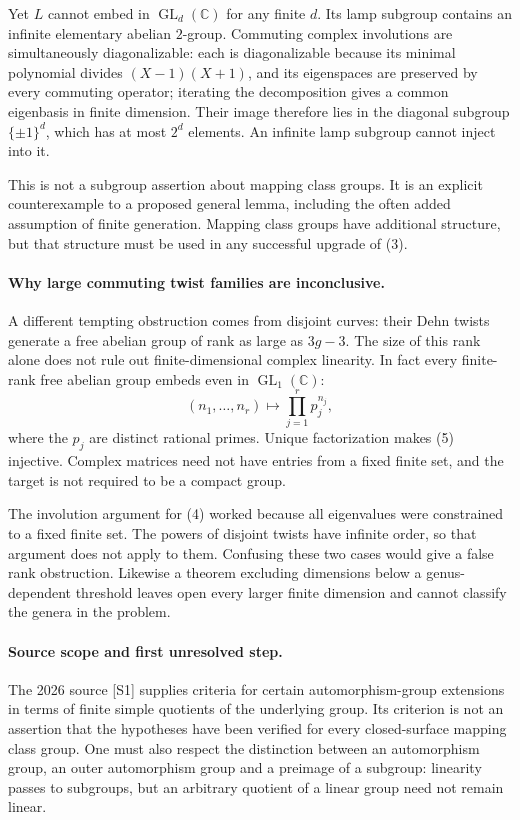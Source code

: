 \documentclass[11pt]{article}
\begin{document}
Yet $L$ cannot embed in $\operatorname{GL}_d(\mathbb C)$ for any finite $d$. Its lamp subgroup contains an infinite elementary abelian $2$-group. Commuting complex involutions are simultaneously diagonalizable: each is diagonalizable because its minimal polynomial divides $(X-1)(X+1)$, and its eigenspaces are preserved by every commuting operator; iterating the decomposition gives a common eigenbasis in finite dimension. Their image therefore lies in the diagonal subgroup $\{\pm1\}^d$, which has at most $2^d$ elements. An infinite lamp subgroup cannot inject into it.

This is not a subgroup assertion about mapping class groups. It is an explicit counterexample to a proposed general lemma, including the often added assumption of finite generation. Mapping class groups have additional structure, but that structure must be used in any successful upgrade of (3).

\paragraph{Why large commuting twist families are inconclusive.}
A different tempting obstruction comes from disjoint curves: their Dehn twists generate a free abelian group of rank as large as $3g-3$. The size of this rank alone does not rule out finite-dimensional complex linearity. In fact every finite-rank free abelian group embeds even in $\operatorname{GL}_1(\mathbb C)$:
\[
 (n_1,\ldots,n_r)\longmapsto\prod_{j=1}^r p_j^{n_j},        \tag{5}
\]
where the $p_j$ are distinct rational primes. Unique factorization makes (5) injective. Complex matrices need not have entries from a fixed finite set, and the target is not required to be a compact group.

The involution argument for (4) worked because all eigenvalues were constrained to a fixed finite set. The powers of disjoint twists have infinite order, so that argument does not apply to them. Confusing these two cases would give a false rank obstruction. Likewise a theorem excluding dimensions below a genus-dependent threshold leaves open every larger finite dimension and cannot classify the genera in the problem.

\paragraph{Source scope and first unresolved step.}
The 2026 source [S1] supplies criteria for certain automorphism-group extensions in terms of finite simple quotients of the underlying group. Its criterion is not an assertion that the hypotheses have been verified for every closed-surface mapping class group. One must also respect the distinction between an automorphism group, an outer automorphism group and a preimage of a subgroup: linearity passes to subgroups, but an arbitrary quotient of a linear group need not remain linear.
\end{document}
